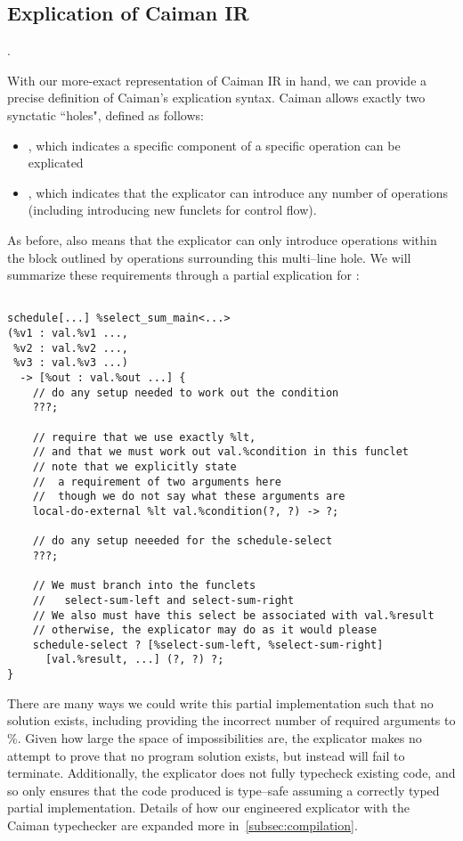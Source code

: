 \subsection{Explication of Caiman IR}

.

With our more-exact representation of Caiman IR in hand, we can provide a precise definition of Caiman's explication syntax.  Caiman allows exactly two synctatic ``holes", defined as follows:
%
\begin{itemize}
\item {}, which indicates a specific component of a specific operation can be explicated
\item {}, which indicates that the explicator can introduce any number of operations (including introducing new funclets for control flow).
\end{itemize}
%
As before,  also means that the explicator can only introduce operations within the block outlined by operations surrounding this multi--line hole.  We will summarize these requirements through a partial explication for :
%
\begin{lstlisting}

schedule[...] %select_sum_main<...>
(%v1 : val.%v1 ..., 
 %v2 : val.%v2 ..., 
 %v3 : val.%v3 ...) 
  -> [%out : val.%out ...] {
    // do any setup needed to work out the condition
    ???;
  
    // require that we use exactly %lt, 
    // and that we must work out val.%condition in this funclet
    // note that we explicitly state 
    //  a requirement of two arguments here
    //  though we do not say what these arguments are
    local-do-external %lt val.%condition(?, ?) -> ?;
    
    // do any setup neeeded for the schedule-select
    ???;
    
    // We must branch into the funclets 
    //   select-sum-left and select-sum-right
    // We also must have this select be associated with val.%result
    // otherwise, the explicator may do as it would please
    schedule-select ? [%select-sum-left, %select-sum-right]
      [val.%result, ...] (?, ?) ?;
}
\end{lstlisting}
%
There are many ways we could write this partial implementation such that no solution exists, including providing the incorrect number of required arguments to \%.  Given how large the space of impossibilities are, the explicator makes no attempt to prove that no program solution exists, but instead will fail to terminate.  Additionally, the explicator does not fully typecheck existing code, and so only ensures that the code produced is type--safe assuming a correctly typed partial implementation.  Details of how our engineered explicator with the Caiman typechecker are expanded more in~\ref{subsec:compilation}.

